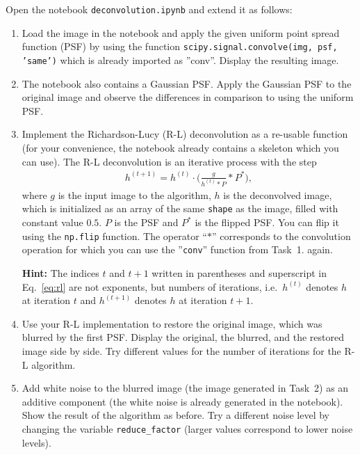\documentclass[12pt,a4paper]{article}
\begin{document}

\noindent
Open the notebook \texttt{deconvolution.ipynb} and extend it as follows:

\begin{enumerate}
    \item Load the image in the notebook and apply the given uniform point spread function (PSF) by using the function \texttt{scipy.signal.convolve(img, psf, 'same')} which is already imported as ''conv''. Display the resulting image.
    \item The notebook also contains a Gaussian PSF. Apply the Gaussian PSF to the original image and observe the differences in comparison to using the uniform PSF.
    \item Implement the Richardson-Lucy (R-L) deconvolution as a re-usable function (for your convenience, the notebook already contains a skeleton which you can use). The R-L deconvolution is an iterative process with the step
    \begin{gather}
        h^{(t+1)} = h^{(t)} \cdot \Big(\frac{g}{h^{(t)} \ast P} \ast P^*\Big),
        \label{eq:rl}
    \end{gather}
    where $g$ is the input image to the algorithm, $h$ is the deconvolved image, which is initialized as an array of the same \texttt{shape} as the image, filled with constant value $0.5$. $P$ is the PSF and $P^*$ is the flipped PSF. You can flip it using the \texttt{np.flip} function. The operator ``$\ast$'' corresponds to the convolution operation for which you can use the ''\texttt{conv}'' function from Task~1. again.
    \par\textbf{Hint:} The indices $t$ and $t+1$ written in parentheses and superscript in Eq.~\eqref{eq:rl} are not exponents, but numbers of iterations, i.e.\ $h^{(t)}$ denotes $h$ at iteration $t$ and $h^{(t+1)}$ denotes $h$ at iteration $t+1$.
    \item Use your R-L implementation to restore the original image, which was blurred by the first PSF. Display the original, the blurred, and the restored image side by side. Try different values for the number of iterations for the R-L algorithm.
    \item Add white noise to the blurred image (the image generated in Task~2) as an additive component (the white noise is already generated in the notebook). Show the result of the algorithm as before. Try a different noise level by changing the variable \texttt{reduce\_factor} (larger values correspond to lower noise levels).

\end{enumerate}
\end{document}
